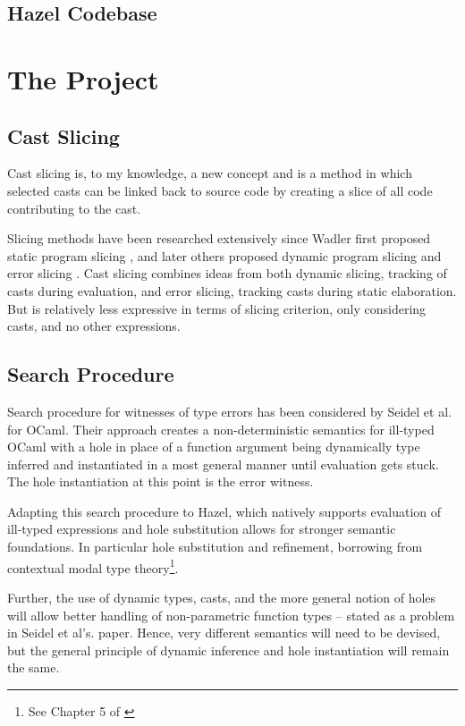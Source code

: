 \subsection{Hazel Codebase}

\section{The Project}
\subsection{Cast Slicing}
Cast slicing is, to my knowledge, a new concept and is a method in which selected casts can be linked back to source code by creating a slice of all code contributing to the cast.\par 
Slicing methods have been researched extensively since Wadler first proposed static program slicing \cite{ProgSlice}, and later others proposed dynamic program slicing \cite{DynProgSlice} and error slicing \cite{ErrSlice}. Cast slicing combines ideas from both dynamic slicing, tracking of casts during evaluation, and error slicing, tracking casts during static elaboration. But is relatively less expressive in terms of slicing criterion, only considering casts, and no other expressions.

\subsection{Search Procedure}
Search procedure for witnesses of type errors has been considered by Seidel et al. \cite{SearchProc} for OCaml. Their approach creates a non-deterministic semantics for ill-typed OCaml with a hole in place of a function argument being dynamically type inferred and instantiated in a most general manner until evaluation gets stuck. The hole instantiation at this point is the error witness.\par 
Adapting this search procedure to Hazel, which natively supports evaluation of ill-typed expressions and hole substitution allows for stronger semantic foundations. In particular hole substitution and refinement, borrowing from contextual modal type theory\footnote{See Chapter 5 of \cite{HazelLivePaper}}.\par 
Further, the use of dynamic types, casts, and the more general notion of holes will allow better handling of non-parametric function types -- stated as a problem in Seidel et al's. paper. Hence, very different semantics will need to be devised, but the general principle of dynamic inference and hole instantiation will remain the same.

